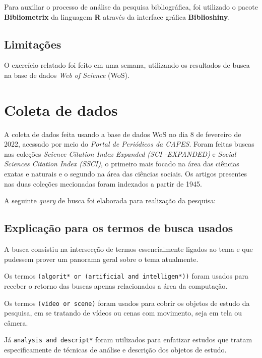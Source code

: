 Para auxiliar o processo de análise da pesquisa bibliográfica, foi utilizado o pacote \textbf{Bibliometrix} da linguagem \textbf{R} através da interface gráfica \textbf{Biblioshiny}.

\subsection{Limitações} 
O exercício relatado foi feito em uma semana, utilizando os resultados de busca na base de dados \textit{Web of Science} (WoS).

\section{Coleta de dados}
A coleta de dados feita usando a base de dados WoS no dia 8 de fevereiro de 2022, acessado por meio do \textit{Portal de Periódicos da CAPES}. Foram feitas buscas nas coleções \textit{Science Citation Index Expanded (SCI -EXPANDED)} e \textit{Social Sciences Citation Index (SSCI)}, o primeiro mais focado na área das ciências exatas e naturais e o segundo na área das ciências sociais. Os artigos presentes nas duas coleções mecionadas foram indexados a partir de 1945.

A seguinte \textit{query} de busca foi elaborada para realização da pesquisa:



\subsection{Explicação para os termos de busca usados}
A busca consistiu na intersecção de termos essencialmente ligados ao tema e que pudessem prover um panorama geral sobre o tema atualmente.

Os termos \texttt{(algorit* or (artificial and intelligen*))} foram usados para receber o retorno das buscas apenas relacionados a área da computação.

Os termos \texttt{(video or scene)} foram usados para cobrir os objetos de estudo da pesquisa, em se tratando de vídeos ou cenas com movimento, seja em tela ou câmera.

Já \texttt{analysis and descript*} foram utilizados para enfatizar estudos que tratam especificamente de técnicas de análise e descrição dos objetos de estudo.

